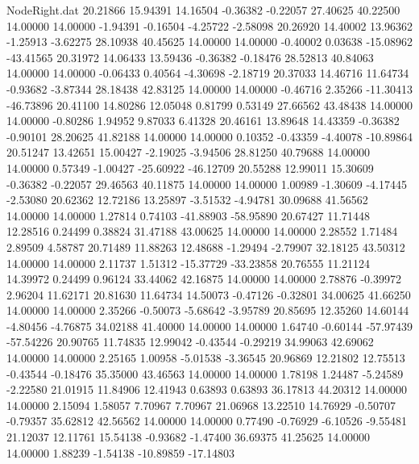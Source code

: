 \begin{filecontents}{NodeRight.dat}
  20.21866   15.94391   14.16504    -0.36382   -0.22057   27.40625   40.22500   14.00000   14.00000   -1.94391   -0.16504   -4.25722   -2.58098
  20.26920   14.40002   13.96362    -1.25913   -3.62275   28.10938   40.45625   14.00000   14.00000   -0.40002    0.03638  -15.08962  -43.41565
  20.31972   14.06433   13.59436    -0.36382   -0.18476   28.52813   40.84063   14.00000   14.00000   -0.06433    0.40564   -4.30698   -2.18719
  20.37033   14.46716   11.64734    -0.93682   -3.87344   28.18438   42.83125   14.00000   14.00000   -0.46716    2.35266  -11.30413  -46.73896
  20.41100   14.80286   12.05048     0.81799    0.53149   27.66562   43.48438   14.00000   14.00000   -0.80286    1.94952    9.87033    6.41328
  20.46161   13.89648   14.43359    -0.36382   -0.90101   28.20625   41.82188   14.00000   14.00000    0.10352   -0.43359   -4.40078  -10.89864
  20.51247   13.42651   15.00427    -2.19025   -3.94506   28.81250   40.79688   14.00000   14.00000    0.57349   -1.00427  -25.60922  -46.12709
  20.55288   12.99011   15.30609    -0.36382   -0.22057   29.46563   40.11875   14.00000   14.00000    1.00989   -1.30609   -4.17445   -2.53080
  20.62362   12.72186   13.25897    -3.51532   -4.94781   30.09688   41.56562   14.00000   14.00000    1.27814    0.74103  -41.88903  -58.95890
  20.67427   11.71448   12.28516     0.24499    0.38824   31.47188   43.00625   14.00000   14.00000    2.28552    1.71484    2.89509    4.58787
  20.71489   11.88263   12.48688    -1.29494   -2.79907   32.18125   43.50312   14.00000   14.00000    2.11737    1.51312  -15.37729  -33.23858
  20.76555   11.21124   14.39972     0.24499    0.96124   33.44062   42.16875   14.00000   14.00000    2.78876   -0.39972    2.96204   11.62171
  20.81630   11.64734   14.50073    -0.47126   -0.32801   34.00625   41.66250   14.00000   14.00000    2.35266   -0.50073   -5.68642   -3.95789
  20.85695   12.35260   14.60144    -4.80456   -4.76875   34.02188   41.40000   14.00000   14.00000    1.64740   -0.60144  -57.97439  -57.54226
  20.90765   11.74835   12.99042    -0.43544   -0.29219   34.99063   42.69062   14.00000   14.00000    2.25165    1.00958   -5.01538   -3.36545
  20.96869   12.21802   12.75513    -0.43544   -0.18476   35.35000   43.46563   14.00000   14.00000    1.78198    1.24487   -5.24589   -2.22580
  21.01915   11.84906   12.41943     0.63893    0.63893   36.17813   44.20312   14.00000   14.00000    2.15094    1.58057    7.70967    7.70967
  21.06968   13.22510   14.76929    -0.50707   -0.79357   35.62812   42.56562   14.00000   14.00000    0.77490   -0.76929   -6.10526   -9.55481
  21.12037   12.11761   15.54138    -0.93682   -1.47400   36.69375   41.25625   14.00000   14.00000    1.88239   -1.54138  -10.89859  -17.14803

\end{filecontents}
